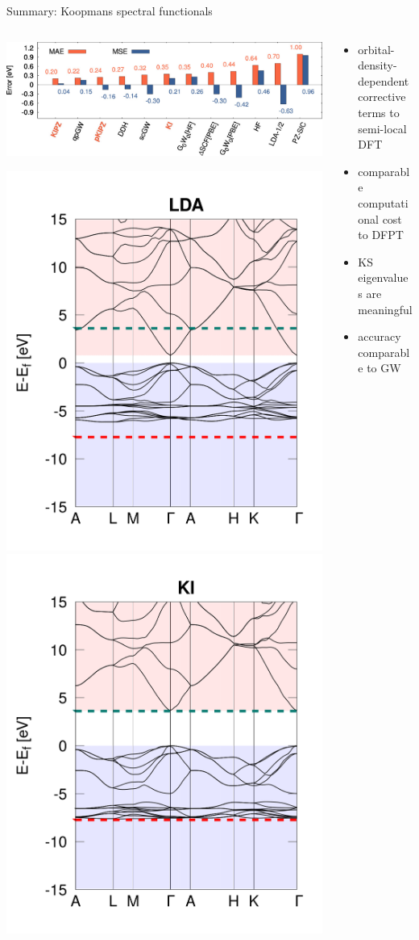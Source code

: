 \documentclass[xcolor=table,aspectratio=169]{beamer}
\numberwithin{equation}{section}
\begin{document}
\begin{frame}{Summary: Koopmans spectral functionals}
   \begin{columns}
      \begin{column}{0.45\textwidth}
         \includegraphics[width=\columnwidth]{figures/colonna_2019_gw100_ip.jpeg}
         \begin{center}
            \includegraphics[width=0.45\columnwidth]{figures/ZnO_lda.png}
            \includegraphics[width=0.45\columnwidth]{figures/ZnO_ki.png}
         \end{center}
      \end{column}
      \begin{column}{0.45\textwidth}
         \begin{itemize}
            \item orbital-density-dependent corrective terms to semi-local DFT
            \item comparable computational cost to DFPT
            \item KS eigenvalues are meaningful
            \item accuracy comparable to GW
         \end{itemize}


\end{column}
\end{columns}
\end{frame}
\end{document}
